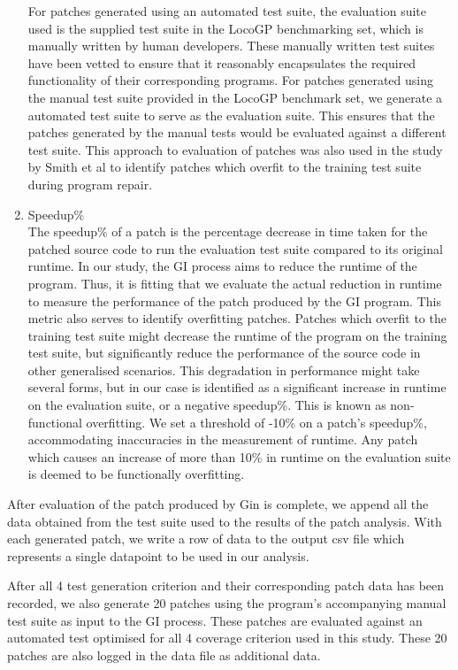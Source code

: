 \documentclass[titlepage]{article}
\begin{document}
\begin{enumerate}
For patches generated using an automated test suite, the evaluation suite used is the supplied test suite in the LocoGP benchmarking set, which is manually written by human developers. These manually written test suites have been vetted to ensure that it reasonably encapsulates the required functionality of their corresponding programs. For patches generated using the manual test suite provided in the LocoGP benchmark set, we generate a automated test suite to serve as the evaluation suite. This ensures that the patches generated by the manual tests would be evaluated against a different test suite. This approach to evaluation of patches was also used in the study by Smith et al \cite{cure} to identify patches which overfit to the training test suite during program repair.

	\item Speedup\% \\
The speedup\% of a patch is the percentage decrease in time taken for the patched source code to run the evaluation test suite compared to its original runtime. In our study, the GI process aims to reduce the runtime of the program. Thus, it is fitting that we evaluate the actual reduction in runtime to measure the performance of the patch produced by the GI program. This metric also serves to identify overfitting patches. Patches which overfit to the training test suite might decrease the runtime of the program on the training test suite, but significantly reduce the performance of the source code in other generalised scenarios. This degradation in performance might take several forms, but in our case is identified as a significant increase in runtime on the evaluation suite, or a negative speedup\%. This is known as non-functional overfitting. We set a threshold of -10\% on a patch’s speedup\%, accommodating inaccuracies in the measurement of runtime. Any patch which causes an increase of more than 10\% in runtime on the evaluation suite is deemed to be functionally overfitting.

\end{enumerate}

After evaluation of the patch produced by Gin is complete, we append all the data obtained from the test suite used to the results of the patch analysis.
With each generated patch, we write a row of data to the output csv file which represents a single datapoint to be used in our analysis.

After all 4 test generation criterion and their corresponding patch data has been recorded, we also generate 20 patches using the program’s accompanying manual test suite as input to the GI process. These patches are evaluated against an automated test optimised for all 4 coverage criterion used in this study. These 20 patches are also logged in the data file as additional data.
\end{document}
